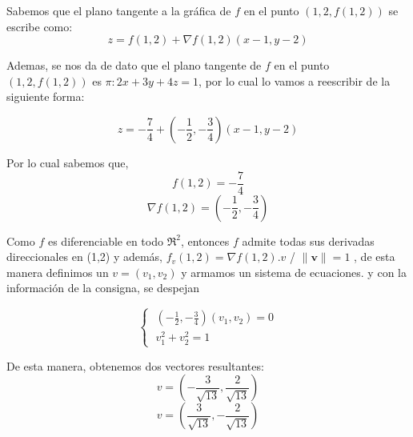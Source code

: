 
\begin{solution}
Sabemos que el plano tangente a la gráfica de $f$ en el punto $(1,2,f(1,2))$ se escribe como:
\[   
    z= f(1,2) + \nabla f(1,2)(x-1,y-2)
\]

Ademas, se nos da de dato que el plano tangente de $f$ en el punto $(1,2,f(1,2))$ es $\pi:2x+3y+4z=1$, por lo cual lo vamos a reescribir de la siguiente forma:

\[   
z= -\frac{7}{4} + (-\frac{1}{2},-\frac{3}{4})(x-1,y-2)
\]

Por lo cual sabemos que,
\[   
f(1,2)=-\frac{7}{4}
\]
\[
 \nabla f(1,2)=(-\frac{1}{2},-\frac{3}{4})
\]


    Como   $f$ es diferenciable en todo $\Re^2$, entonces $f$ admite todas sus derivadas direccionales en (1,2) y además, $f_v(1,2)=\nabla f(1,2).v$ / $\|\mathbf{v}\|=1$ , de esta manera definimos un $v=(v_1,v_2)$ y armamos un sistema de ecuaciones.
     y con la información de la consigna, se despejan
     
    \[\begin{cases}
            \;(-\frac{1}{2},-\frac{3}{4})(v_1,v_2)=0 \\[5pt]
            \;v_1^2+v_2^2=1
        \end{cases}
    \]
    
    De esta manera, obtenemos dos vectores resultantes:
    \[
    v=(-\frac{3}{\sqrt{13}},\frac{2}{\sqrt{13}})
    \]
     \[
    v=(\frac{3}{\sqrt{13}},-\frac{2}{\sqrt{13}})
    \]
    

\newpage
\end{solution}

